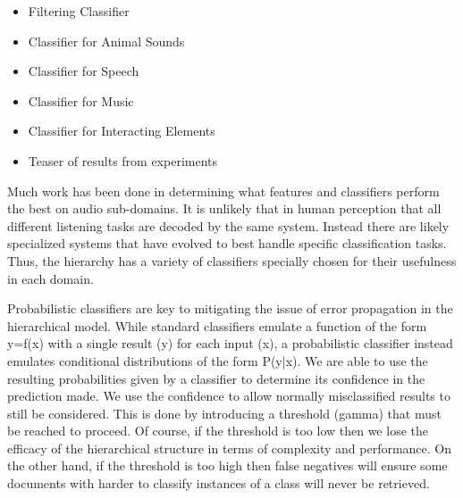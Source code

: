 \begin{itemize}
    \item Filtering Classifier
    \item Classifier for Animal Sounds
    \item Classifier for Speech
    \item Classifier for Music
    \item Classifier for Interacting Elements
    \item Teaser of results from experiments
\end{itemize}
Much work has been done in determining what features and classifiers perform the best on audio sub-domains. It is unlikely that in human perception that all different listening tasks are decoded by the same system. Instead there are likely specialized systems that have evolved to best handle specific classification tasks. Thus, the hierarchy has a variety of classifiers specially chosen for their usefulness in each domain.

Probabilistic classifiers are key to mitigating the issue of error propagation in the hierarchical model. While standard classifiers emulate a function of the form y=f(x) with a single result (y) for each input (x), a probabilistic classifier instead emulates conditional distributions of the form P(y|x). We are able to use the resulting probabilities given by a classifier to determine its confidence in the prediction made. We use the confidence to allow normally misclassified results to still be considered. This is done by introducing a threshold (gamma) that must be reached to proceed. Of course, if the threshold is too low then we lose the efficacy of the hierarchical structure in terms of complexity and performance. On the other hand, if the threshold is too high then false negatives will ensure some documents with harder to classify instances of a class will never be retrieved.


